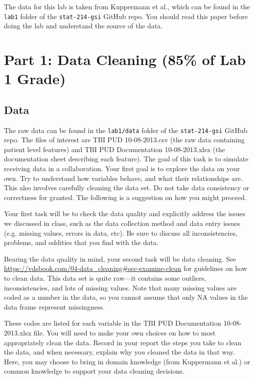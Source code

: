 \documentclass[10pt,letterpaper]{article}
\begin{document}
The data for this lab is taken from Kuppermann et al., which can be found in the \texttt{lab1} folder of the \texttt{stat-214-gsi} GitHub repo. You should read this paper before doing the lab and understand the source of the data.

\section*{Part 1: Data Cleaning (85\% of Lab 1 Grade)}
\subsection*{Data}

The raw data can be found in the \texttt{lab1/data} folder of the \texttt{stat-214-gsi} GitHub repo. The files of interest are TBI PUD 10-08-2013.csv (the raw data containing patient level features) and TBI PUD Documentation 10-08-2013.xlsx (the documentation sheet describing each feature). The goal of this task is to simulate receiving data in a collaboration. Your first goal is to explore the data on your own. Try to understand how variables behave, and what their relationships are. This also involves carefully cleaning the data set. Do not take data consistency or correctness for granted. The following is a suggestion on how you might proceed.

Your first task will be to check the data quality and explicitly address the issues we discussed in class, such as the data collection method and data entry issues (e.g. missing values, errors in data, etc). Be sure to discuss all inconsistencies, problems, and oddities that you find with the data.

Bearing the data quality in mind, your second task will be data cleaning. See \url{https://vdsbook.com/04-data_cleaning#sec-examine-clean} for guidelines on how to clean data. This data set is quite raw---it contains some outliers, inconsistencies, and lots of missing values. Note that many missing values are coded as a number in the data, so you cannot assume that only NA values in the data frame represent missingness.

These codes are listed for each variable in the TBI PUD Documentation 10-08-2013.xlsx file. You will need to make your own choices on how to most appropriately clean the data. Record in your report the steps you take to clean the data, and when necessary, explain why you cleaned the data in that way. Here, you may choose to bring in domain knowledge (from Kuppermann et al.) or common knowledge to support your data cleaning decisions.
\end{document}
